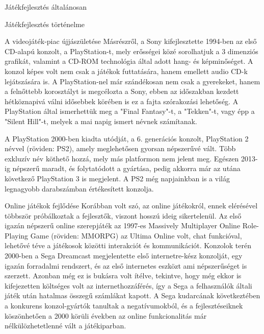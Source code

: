 \begin{MyChapter}{Játékfejlesztés általánosan}
\begin{MySection}{Játékfejlesztés történelme}
\begin{MySubSection}{A videojáték-piac újjászületése}
			Másrészről, a Sony kifejlesztette 1994-ben az első CD-alapú konzolt, a PlayStation-t, mely erősségei közé sorolhatjuk a 3 dimenziós grafikát, valamint a CD-ROM technológia által adott hang- és képminőséget. A konzol képes volt nem csak a játékok futtatására, hanem emellett audio CD-k lejátszására is. A PlayStation-nel már szándékosan nem csak a gyerekeket, hanem a felnőttebb korosztályt is megcélozta a Sony, ebben az időszakban kezdett hétköznapivá válni idősebbek körében is ez a fajta szórakozási lehetőség. A PlayStation által ismerhettük meg a "Final Fantasy"-t, a "Tekken"-t, vagy épp a "Silent Hill"-t, melyek a mai napig ismert névnek számítanak.
			
			A PlayStation 2000-ben kiadta utódját, a 6. generációs konzolt, PlayStation 2 névvel (röviden: PS2), amely meglehetősen gyorsan népszerűvé vált. Több exkluzív név köthető hozzá, mely más platformon nem jelent meg. Egészen 2013-ig népszerű maradt, és folytatódott a gyártása, pedig akkorra már az utána következő PlayStation 3 is megjelent. A PS2 még napjainkban is a világ legnagyobb darabszámban értékesített konzolja.
		\end{MySubSection}
		
		\begin{MySubSection}{Online játékok fejlődése}
			Korábban volt szó, az online játékokról, ennek elérésével többször próbálkoztak a fejlesztők, viszont hosszú ideig sikertelenül. Az első igazán népszerű online szerepjáték az 1997-es Massively Multiplayer Online Role-Playing Game (röviden: MMORPG) az Ultima Online volt, chat funkcióval, lehetővé téve a játékosok közötti interakciót és kommunikációt. Konzolok terén 2000-ben a Sega Dreamcast megjelentette első internetre-kész konzolját, egy igazán forradalmi rendszert, és az első internetes eszközt ami népszerűséget is szerzett. Azonban még ez is bukásra volt ítélve, tekintve, hogy még ekkor is kifejezetten költséges volt az internethozzáférés, így a Sega a felhasználók általi játék után hatalmas összegű számlákat kapott. A Sega kudarcának következtében a konkurens konzol-gyártók tanultak a negatívumokból, és a fejlesztéseiknek köszönhetően a 2000 körüli években az online funkcionalitás már nélkülözhetetlenné vált a játékiparban.
		\end{MySubSection}
		

\end{MySection}
\end{MyChapter}
